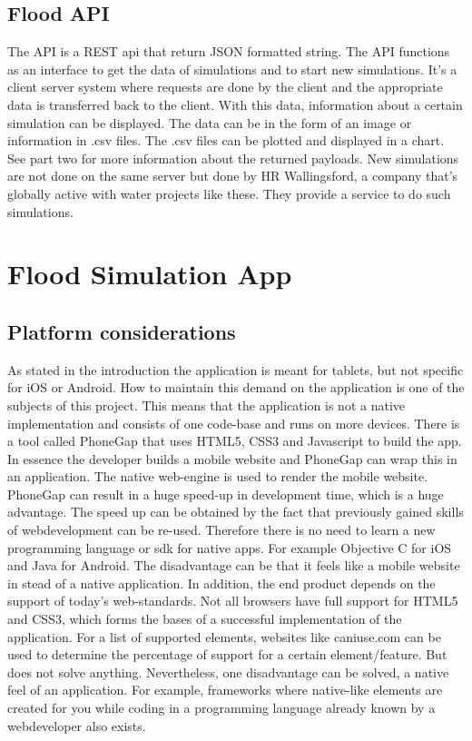 \subsection{Flood API}
The API is a REST api that return JSON formatted string. The API functions as an interface to get the data of simulations and to start new simulations. It's a client server system where requests are done by the client and the appropriate data is transferred back to the client. With this data, information about a certain simulation can be displayed. The data can be in the form of an image or information in .csv files. The .csv files can be plotted and displayed in a chart. See part two for more information about the returned payloads.
New simulations are not done on the same server but done by HR Wallingsford, a company that's globally active with water projects like these. They provide a service to do such simulations.


\section{Flood Simulation App}
\subsection{Platform considerations}
As stated in the introduction the application is meant for tablets, but not specific for iOS or Android. How to maintain this demand on the application is one of the subjects of this project. This means that the application is not a native implementation and consists of one code-base and runs on more devices. There is a tool called PhoneGap \cite{PhoneGap} that uses HTML5, CSS3 and Javascript to build the app. In essence the developer builds a mobile website and PhoneGap can wrap this in an application. The native web-engine is used to render the mobile website. PhoneGap can result in a huge speed-up in development time, which is a huge advantage.  The speed up can be obtained by the fact that previously gained skills of webdevelopment can be re-used. Therefore there is no need to learn a new programming language or sdk for native apps. For example Objective C for iOS and Java for Android. The disadvantage can be that it feels like a mobile website in stead of a native application. In addition, the end product depends on the support of today's web-standards. Not all browsers have full support for HTML5 and CSS3, which forms the bases of a successful implementation of the application. For a list of supported elements, websites like caniuse.com \cite{CSS3} can be used to determine the percentage of support for a certain element/feature. But does not solve anything. Nevertheless, one disadvantage can be solved, a native feel of an application. For example, frameworks where native-like elements are created for you while coding in a programming language already known by a webdeveloper also exists.

